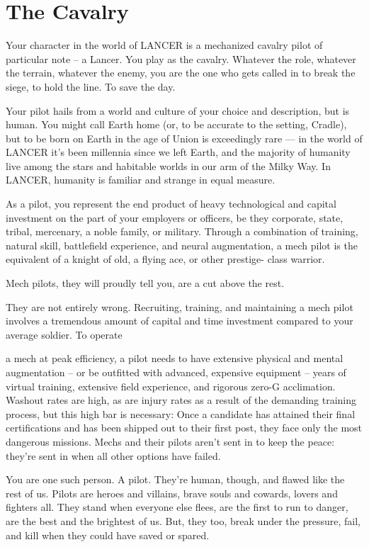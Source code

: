\section{The Cavalry}

Your character in the world of LANCER is a mechanized cavalry pilot of particular note -- a
Lancer. You play as the cavalry. Whatever the role, whatever the terrain, whatever the enemy,
you are the one who gets called in to break the siege, to hold the line. To save the day.


Your pilot hails from a world and culture of your choice and description, but is human. You might
call Earth home (or, to be accurate to the setting, Cradle), but to be born on Earth in the age of
Union is exceedingly rare — in the world of LANCER it’s been millennia since we left Earth, and
the majority of humanity live among the stars and habitable worlds in our arm of the Milky Way.
In LANCER, humanity is familiar and strange in equal measure.


As a pilot, you represent the end product of heavy technological and capital investment on the
part of your employers or officers, be they corporate, state, tribal, mercenary, a noble family, or
military. Through a combination of training, natural skill, battlefield experience, and neural
augmentation, a mech pilot is the equivalent of a knight of old, a flying ace, or other prestige-
class warrior.


Mech pilots, they will proudly tell you, are a cut above the rest.


They are not entirely wrong. Recruiting, training, and maintaining a mech pilot involves a
tremendous amount of capital and time investment compared to your average soldier. To operate




a mech at peak efficiency, a pilot needs to have extensive physical and mental augmentation --
or be outfitted with advanced, expensive equipment -- years of virtual training, extensive field
experience, and rigorous zero-G acclimation. Washout rates are high, as are injury rates as a
result of the demanding training process, but this high bar is necessary: Once a candidate has
attained their final certifications and has been shipped out to their first post, they face only the
most dangerous missions. Mechs and their pilots aren’t sent in to keep the peace: they’re sent in
when all other options have failed.


You are one such person. A pilot. They’re human, though, and flawed like the rest of us. Pilots
are heroes and villains, brave souls and cowards, lovers and fighters all. They stand when
everyone else flees, are the first to run to danger, are the best and the brightest of us. But, they
too, break under the pressure, fail, and kill when they could have saved or spared.


